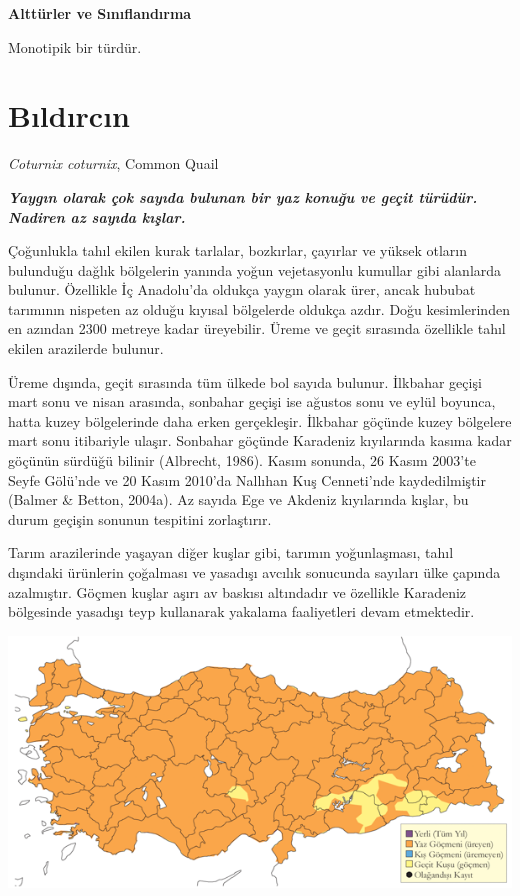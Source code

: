 \documentclass[
  a4paper,
  DIV=11,
  numbers=noendperiod]{scrreprt}
\begin{document}
\textbf{Alttürler ve Sınıflandırma}

Monotipik bir türdür.

\section{Bıldırcın}\label{bux131ldux131rcux131n}

\emph{Coturnix coturnix}, Common Quail

\textbf{\emph{Yaygın olarak çok sayıda bulunan bir yaz konuğu ve geçit
türüdür. Nadiren az sayıda kışlar.}}

Çoğunlukla tahıl ekilen kurak tarlalar, bozkırlar, çayırlar ve yüksek
otların bulunduğu dağlık bölgelerin yanında yoğun vejetasyonlu kumullar
gibi alanlarda bulunur. Özellikle İç Anadolu'da oldukça yaygın olarak
ürer, ancak hububat tarımının nispeten az olduğu kıyısal bölgelerde
oldukça azdır. Doğu kesimlerinden en azından 2300 metreye kadar
üreyebilir. Üreme ve geçit sırasında özellikle tahıl ekilen arazilerde
bulunur.

Üreme dışında, geçit sırasında tüm ülkede bol sayıda bulunur. İlkbahar
geçişi mart sonu ve nisan arasında, sonbahar geçişi ise ağustos sonu ve
eylül boyunca, hatta kuzey bölgelerinde daha erken gerçekleşir. İlkbahar
göçünde kuzey bölgelere mart sonu itibariyle ulaşır. Sonbahar göçünde
Karadeniz kıyılarında kasıma kadar göçünün sürdüğü bilinir (Albrecht,
1986). Kasım sonunda, 26 Kasım 2003'te Seyfe Gölü'nde ve 20 Kasım
2010'da Nallıhan Kuş Cenneti'nde kaydedilmiştir (Balmer \& Betton,
2004a). Az sayıda Ege ve Akdeniz kıyılarında kışlar, bu durum geçişin
sonunun tespitini zorlaştırır.

Tarım arazilerinde yaşayan diğer kuşlar gibi, tarımın yoğunlaşması,
tahıl dışındaki ürünlerin çoğalması ve yasadışı avcılık sonucunda
sayıları ülke çapında azalmıştır. Göçmen kuşlar aşırı av baskısı
altındadır ve özellikle Karadeniz bölgesinde yasadışı teyp kullanarak
yakalama faaliyetleri devam etmektedir.

\includegraphics{images/harita_Page_043.png}
\end{document}
